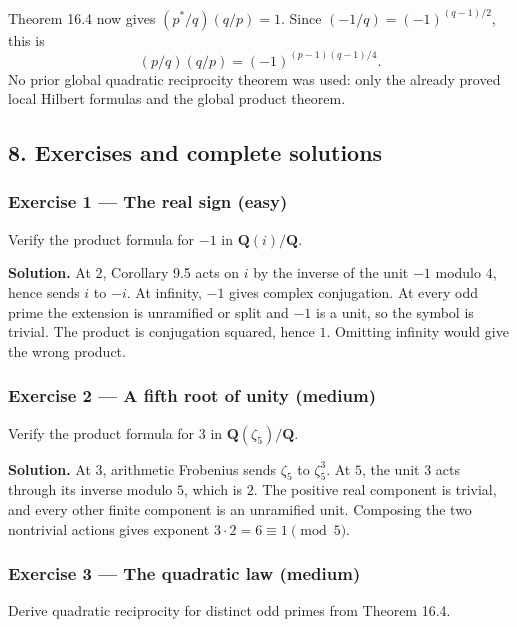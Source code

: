 \documentclass[11pt,a4paper]{article}
\begin{document}
Theorem 16.4 now gives \((p^*/q)(q/p)=1\). Since
\((-1/q)=(-1)^{(q-1)/2}\), this is \[
(p/q)(q/p)=(-1)^{(p-1)(q-1)/4}.
\tag{17}
\] No prior global quadratic reciprocity theorem was used: only the
already proved local Hilbert formulas and the global product theorem.

\subsection{8. Exercises and complete
solutions}\label{exercises-and-complete-solutions}

\subsubsection{Exercise 1 --- The real sign
(easy)}\label{exercise-1-the-real-sign-easy}

Verify the product formula for \(-1\) in \(\mathbf Q(i)/\mathbf Q\).

\textbf{Solution.} At \(2\), Corollary 9.5 acts on \(i\) by the inverse
of the unit \(-1\) modulo \(4\), hence sends \(i\) to \(-i\). At
infinity, \(-1\) gives complex conjugation. At every odd prime the
extension is unramified or split and \(-1\) is a unit, so the symbol is
trivial. The product is conjugation squared, hence \(1\). Omitting
infinity would give the wrong product.

\subsubsection{Exercise 2 --- A fifth root of unity
(medium)}\label{exercise-2-a-fifth-root-of-unity-medium}

Verify the product formula for \(3\) in
\(\mathbf Q(\zeta_5)/\mathbf Q\).

\textbf{Solution.} At \(3\), arithmetic Frobenius sends \(\zeta_5\) to
\(\zeta_5^3\). At \(5\), the unit \(3\) acts through its inverse modulo
\(5\), which is \(2\). The positive real component is trivial, and every
other finite component is an unramified unit. Composing the two
nontrivial actions gives exponent \(3\cdot2=6\equiv1\pmod5\).

\subsubsection{Exercise 3 --- The quadratic law
(medium)}\label{exercise-3-the-quadratic-law-medium}

Derive quadratic reciprocity for distinct odd primes from Theorem 16.4.
\end{document}
